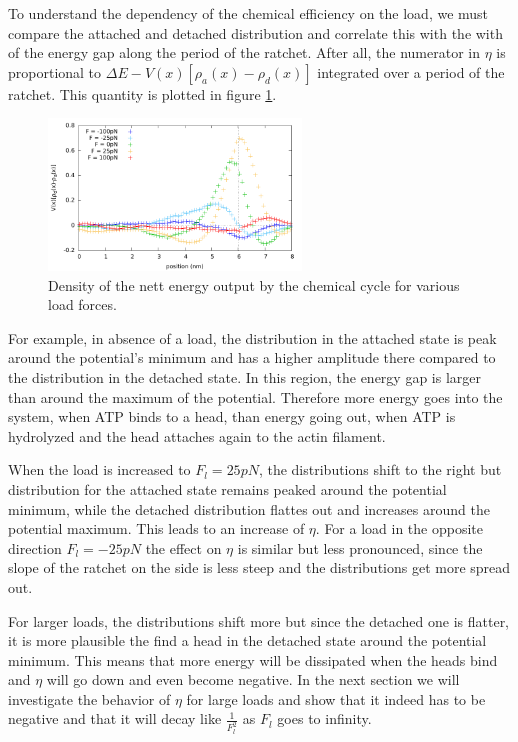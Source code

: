 \documentclass[aps,pre,onecolumn,showpacs,showkeys,a4paper]{revtex4}
\begin{document}
To understand the dependency of the chemical efficiency on the load, we must compare the attached and detached distribution and correlate this with the with of the energy gap along the period of the ratchet. 
After all, the numerator in $\eta$ is proportional to $\Delta E - V(x)\left[\rho_a(x) - \rho_d(x)\right]$ integrated over a period of the ratchet. 
This quantity is plotted in figure \ref{Fig: chem_energy_distr}.\par
\begin{figure}[h]
\centering
\includegraphics[width=0.6\textwidth,height=!]{chem_energy_distr_all_F}
\caption{Density of the nett energy output by the chemical cycle for various load forces.}
\label{Fig: chem_energy_distr}
\end{figure}
For example, in absence of a load, the distribution in the attached state is peak around the potential's minimum and has a higher amplitude there compared to the distribution in the detached state. 
In this region, the energy gap is larger than around the maximum of the potential. 
Therefore more energy goes into the system, when ATP binds to a head, than energy going out, when ATP is hydrolyzed and the head attaches again to the actin filament. \par 
When the load is increased to $F_l= 25 pN$, the distributions shift to the right but distribution for the attached state remains peaked around the potential minimum, while the detached distribution flattes out and increases around the potential maximum. 
This leads to an increase of $\eta$. 
For a load in the opposite direction $F_l = -25 pN$ the effect on $\eta$ is similar but less pronounced, since the slope of the ratchet on the side is less steep and the distributions get more spread out. \par
For larger loads, the distributions shift more but since the detached one is flatter, it is more plausible the find a head in the detached state around the potential minimum. 
This means that more energy will be dissipated when the heads bind and $\eta$ will go down and even become negative. 
In the next section we will investigate the behavior of $\eta$ for large loads and show that it indeed has to be negative and that it will decay like $\frac{1}{F_l^2}$ as $F_l$ goes to infinity.
\end{document}
